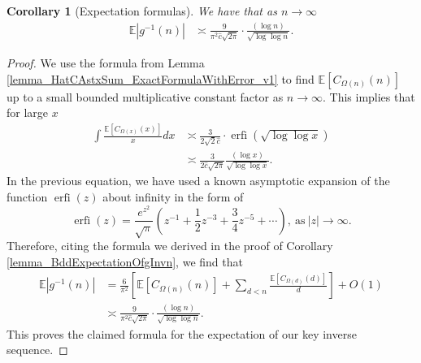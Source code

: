 \documentclass[11pt,reqno,a4letter]{article}
\numberwithin{figure}{section}
\numberwithin{table}{section}
\theoremstyle{plain}
\newtheorem{cor}[theorem]{Corollary}
\numberwithin{theorem}{section}
\theoremstyle{definition}
\begin{document}
\begin{cor}[Expectation formulas] 
\label{cor_ExpectationFormulaAbsgInvn_v2} 
We have that as $n \rightarrow \infty$ 
\begin{align*} 
\mathbb{E}|g^{-1}(n)| & \asymp \frac{9}{\pi^2 \hat{c} \sqrt{2\pi}} \cdot \frac{(\log n)}{\sqrt{\log\log n}}. 
\end{align*} 
\end{cor} 
\begin{proof} 
We use the formula from Lemma \ref{lemma_HatCAstxSum_ExactFormulaWithError_v1} 
to find $\mathbb{E}[C_{\Omega(n)}(n)]$ up to a small bounded multiplicative 
constant factor as $n \rightarrow \infty$.
This implies that for large $x$ 
\begin{align*} 
\int \frac{\mathbb{E}[C_{\Omega(x)}(x)]}{x} dx & \asymp 
     \frac{3}{2\sqrt{2} \hat{c}} \cdot \operatorname{erfi}\left(\sqrt{\log\log x}\right) \\ 
     & \asymp \frac{3}{2\hat{c} \sqrt{2\pi}} \frac{(\log x)}{\sqrt{\log\log x}}. 
\end{align*} 
In the previous equation, we have used a known asymptotic expansion of the function $\operatorname{erfi}(z)$ 
about infinity in the form of \cite[\S 3.2]{INCGAMMA-BOOK} 
\[
\operatorname{erfi}(z) = \frac{e^{z^2}}{\sqrt{\pi}} \left(z^{-1} + \frac{1}{2}z^{-3} + \frac{3}{4}z^{-5} + \cdots \right), 
     \mathrm{\ as\ } |z| \rightarrow \infty. 
\]
Therefore, citing the formula we derived in the proof of 
Corollary \ref{lemma_BddExpectationOfgInvn}, we find that 
\begin{align*} 
\mathbb{E}|g^{-1}(n)| & = \frac{6}{\pi^2}\left[\mathbb{E}[C_{\Omega(n)}(n)] + 
     \sum_{d<n} \frac{\mathbb{E}[C_{\Omega(d)}(d)]}{d}\right] + O(1) \\ 
     & \asymp \frac{9}{\pi^2 \hat{c} \sqrt{2\pi}} \cdot \frac{(\log n)}{\sqrt{\log\log n}}. 
\end{align*} 
This proves the claimed formula for the expectation of our key inverse sequence. 
\end{proof} 
\end{document}
